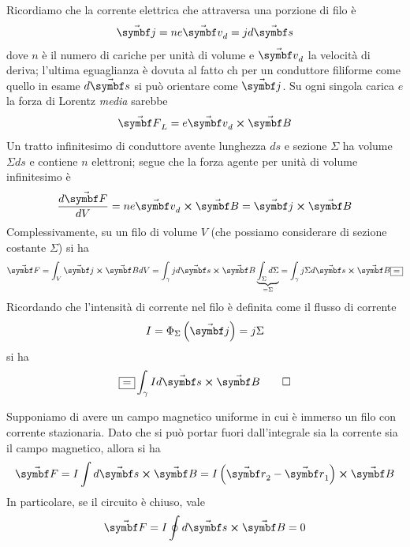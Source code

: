 \begin{demonstration}
	Ricordiamo che la corrente elettrica che attraversa una porzione di filo è
	\begin{equation*}
		\vba{j}=ne\vba{v}_d=jd\vba{s}
	\end{equation*}
	dove $n$ è il numero di cariche per unità di volume e $\vba{v}_d$ la velocità di deriva; l'ultima eguaglianza è dovuta al fatto ch per un conduttore filiforme come quello in esame $d\vba{s}$ si può orientare come $\vba{j}$. Su ogni singola carica $e$ la forza di Lorentz \textit{media} sarebbe
	\begin{equation*}
		\vba{F}_L=e\vba{v}_d\cross\vba{B}
	\end{equation*}
	Un tratto infinitesimo di conduttore avente lunghezza $ds$ e sezione $\Sigma$ ha volume $\Sigma ds$ e contiene $n$ elettroni; segue che la forza agente per unità di volume infinitesimo è
	\begin{equation*}
		\frac{d\vba{F}}{dV}=ne\vba{v}_d\cross\vba{B}=\vba{j}\cross\vba{B}
	\end{equation*}
	Complessivamente, su un filo di volume $V$ (che possiamo considerare di sezione costante $\Sigma$) si ha
	\begin{equation}
		\vba{F}=\int_V\vba{j}\cross\vba{B}dV=\int_{\gamma} jd\vba{s}\cross\vba{B}\underbrace{\int_{\Sigma}d\Sigma}_{=\Sigma}=\int_{\gamma} j\Sigma d\vba{s}\cross\vba{B}\squarequal
	\end{equation}
	Ricordando che l'intensità di corrente nel filo è definita come il flusso di corrente
	\begin{equation*}
		I=\Phi_{\Sigma}\left(\vba{j}\right)=j\Sigma
	\end{equation*}
	si ha
	\begin{equation*}
		\squarequal\int_{\gamma} Id\vba{s}\cross\vba{B}\qedhere
	\end{equation*}
\end{demonstration}
\begin{example}\label{RisultateSpiraNulla}
	Supponiamo di avere un campo magnetico uniforme in cui è immerso un filo con corrente stazionaria. Dato che si può portar fuori dall'integrale sia la corrente sia il campo magnetico, allora si ha
	\begin{equation}
		\vba{F}=I\int d\vba{s}\cross\vba{B}=I\left(\vba{r}_2-\vba{r}_1\right)\cross\vba{B}
	\end{equation}
In particolare, se il circuito è chiuso, vale
\begin{equation}
	\vba{F}=I\oint d\vba{s}\cross\vba{B}=0
\end{equation}
\end{example}
